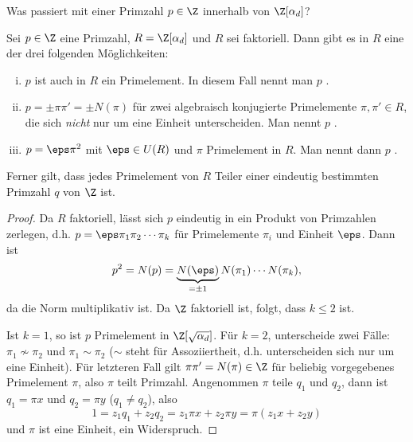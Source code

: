 Was passiert mit einer Primzahl $p \in \Z$ innerhalb von $\Z[\alpha_d]$?

\begin{st} \label{4.12}
	Sei $p \in \Z$ eine Primzahl, $R = \Z[\alpha_d]$ und $R$ sei faktoriell.
	Dann gibt es in $R$ eine der drei folgenden Möglichkeiten:
	\begin{enumerate}[(i)]
		\item
			$p$ ist auch in $R$ ein Primelement.
			In diesem Fall nennt man $p$ .
		\item
			$p = \pm \pi \pi' = \pm N(\pi)$ für zwei algebraisch konjugierte Primelemente $\pi, \pi' \in R$, die sich \emph{nicht} nur um eine Einheit unterscheiden.
			Man nennt $p$ .
		\item
			$p = \eps \pi^2$ mit $\eps \in U(R)$ und $\pi$ Primelement in $R$.
			Man nennt dann $p$ .
	\end{enumerate}
	Ferner gilt, dass jedes Primelement von $R$ Teiler einer eindeutig bestimmten Primzahl $q$ von $\Z$ ist.
	\begin{proof}
		Da $R$ faktoriell, lässt sich $p$ eindeutig in ein Produkt von Primzahlen zerlegen, d.h. $p = \eps \pi_1 \pi_2 \dotsb \pi_k$ für Primelemente $\pi_i$ und Einheit $\eps$.
		Dann ist
		\[
			p^2 = N(p) = \underbrace{N(\eps)}_{=\pm 1} N(\pi_1) \dotsb N(\pi_k),
		\]
		da die Norm multiplikativ ist.
		Da $\Z$ faktoriell ist, folgt, dass $k \le 2$ ist.

		Ist $k = 1$, so ist $p$ Primelement in $\Z[\sqrt{\alpha_d}]$.
		Für $k = 2$, unterscheide zwei Fälle: $\pi_1 \not\sim \pi_2$ und $\pi_1 \sim \pi_2$ ($\sim$ steht für Assoziiertheit, d.h. unterscheiden sich nur um eine Einheit).
		Für letzteren Fall gilt $\pi \pi' = N(\pi) \in \Z$ für beliebig vorgegebenes Primelement $\pi$, also $\pi$ teilt Primzahl.
		Angenommen $\pi$ teile $q_1$ und $q_2$, dann ist $q_1 = \pi x$ und $q_2 = \pi y$ ($q_1 \neq q_2$), also
		\[
			1 = z_1 q_1 + z_2 q_2
			= z_1 \pi x + z_2 \pi y
			= \pi(z_1 x + z_2 y)
		\]
		und $\pi$ ist eine Einheit, ein Widerspruch.
	\end{proof}
\end{st}


